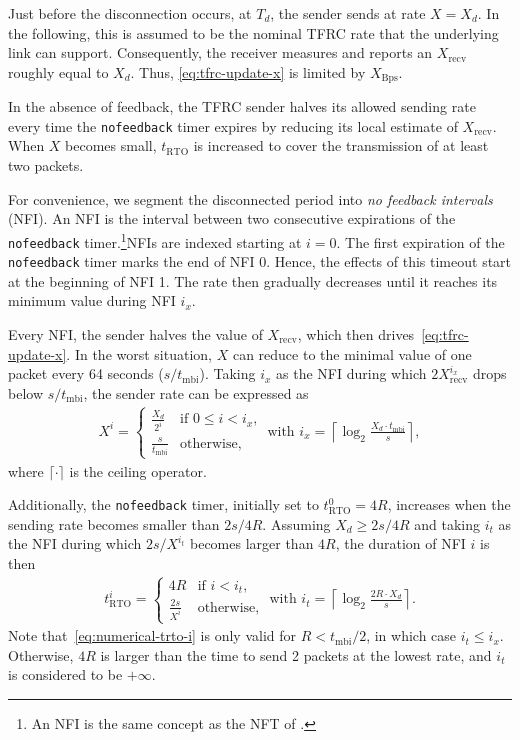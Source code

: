 \documentclass[twocolumn]{nictatechreport}
\begin{document}
Just before the disconnection occurs, at $T_d$, the sender sends at rate $X=X_d$.
In the following, this is assumed to be the nominal TFRC rate that the
underlying link can support. Consequently, the receiver measures and reports an
$X_\mathrm{recv}$ roughly equal to $X_d$.  Thus, \eqref{eq:tfrc-update-x}
is limited by $X_\mathrm{Bps}$.

In the absence of feedback, the TFRC sender halves its allowed sending rate
every time the \verb#nofeedback# timer expires by reducing its local estimate of
$X_\mathrm{recv}$. When $X$ becomes small, $t_\mathrm{RTO}$ is increased to
cover the transmission of at least two packets.

For convenience, we segment the disconnected period into \emph{no feedback
intervals} (NFI). An NFI is the interval between two consecutive expirations of
the \verb#nofeedback# timer.\footnote{An NFI is the same concept as the NFT of \cite{draft-ietf-dccp-tfrc-faster-restart-06}.}NFIs are indexed starting at
$i=0$. The first expiration of the \verb#nofeedback# timer marks the end of NFI
0. Hence, the effects of this timeout start at the beginning of NFI 1.  The rate
then gradually decreases until it reaches its minimum value during NFI $i_x$.

Every NFI, the sender halves the value of $X_\mathrm{recv}$, which then
drives~\eqref{eq:tfrc-update-x}. In the worst situation, $X$ can reduce to the
minimal value of one packet every 64 seconds ($s/t_\mathrm{mbi}$).  Taking $i_x$
as the NFI during which $2X_\mathrm{recv}^{i_x}$ drops below $s/t_\mathrm{mbi}$,
the sender rate can be expressed as
\begin{gather}
  X^i = \begin{cases}
    \frac{X_d}{2^{i}} & \text{if $0 \leq i < i_x$,} \\
    \frac{s}{t_\mathrm{mbi}} & \text{otherwise,}
  \end{cases}
  \label{eq:numerical-x-i} \text{ with } 
  i_x =  \left\lceil \log_2\frac{X_d\cdot t_\mathrm{mbi}}s \right\rceil,
\end{gather}
where $\lceil\cdot\rceil$ is the ceiling operator.

Additionally, the \verb#nofeedback# timer, initially set to
$t_\mathrm{RTO}^0=4R$, increases when the sending rate becomes smaller than
$2s/4R$. Assuming $X_d\ge2s/4R$ and taking $i_t$ as the NFI during which
$2s/X^{i_t}$ becomes larger than $4R$, the duration of NFI $i$ is then
\begin{gather}
  t_\mathrm{RTO}^i = \begin{cases}
    4R & \text{if $i < i_t$,} \\
    \frac{2s}{X^i} & \text{otherwise,}
  \end{cases}
  \label{eq:numerical-trto-i} \text{ with }
  i_t =  \left\lceil \log_2\frac{2R\cdot X_d}s \right\rceil.
\end{gather}
Note that~\eqref{eq:numerical-trto-i} is only valid for $R<t_\mathrm{mbi}/2$, in
which case $i_t \le i_x$. Otherwise, $4R$ is larger than the time to send 2
packets at the lowest rate, and $i_t$ is considered to be $+\infty$.
\end{document}
